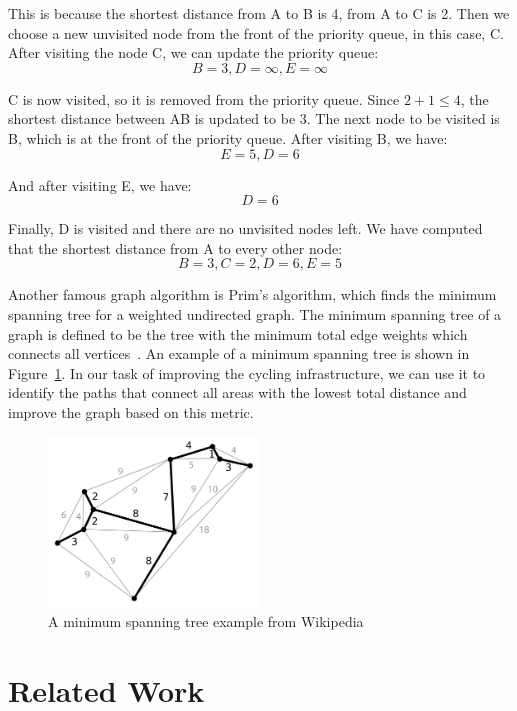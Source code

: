 \documentclass[12pt,a4paper]{report}
\begin{document}
This is because the shortest distance from A to B is 4, from A to C is 2. Then we choose a new unvisited node from the front of the priority queue, in this case, C. After visiting the node C, we can update the priority queue:
\[B=3, D=\infty, E=\infty\]

C is now visited, so it is removed from the priority queue. Since $2+1 \leq 4$, the shortest distance between AB is updated to be 3. The next node to be visited is B, which is at the front of the priority queue. After visiting B, we have:
\[E=5, D=6\]

And after visiting E, we have:
\[D=6\]

Finally, D is visited and there are no unvisited nodes left. We have computed that the shortest distance from A to every other node:
\[B=3, C=2, D=6, E=5\]

Another famous graph algorithm is Prim's algorithm, which finds the minimum spanning tree for a weighted undirected graph. The minimum spanning tree of a graph is defined to be the tree with the minimum total edge weights which connects all vertices~\cite{Pettie2008}. An example of a minimum spanning tree is shown in Figure~\ref{fig:mst_example}. In our task of improving the cycling infrastructure, we can use it to identify the paths that connect all areas with the lowest total distance and improve the graph based on this metric.

\begin{figure}[ht]
\centering
\includegraphics[width=0.5\textwidth]{plan_images/MST.png}
\caption{A minimum spanning tree example from Wikipedia~\cite{WikipediaEN:MST}}
\label{fig:mst_example}
\end{figure}

\section{Related Work} \label{sec:related_work}
\end{document}
